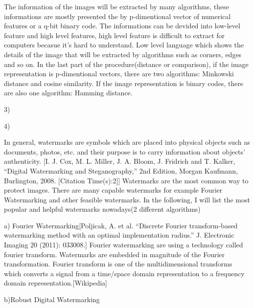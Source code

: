 The information of the images will be extracted by many algorithms, 
these informations are mostly presented the by p-dimentional vector of numerical features or a q-bit binary code.
The informations can be devided into low-level feature and high level features, 
high level feature is difficult to extract for computers becasue it's hard to understand.
Low level language which shows the details of the image that will be extracted by algorithms such as corners, edges and so on.
In the last part of the procedure(distance or comparison), if the image representation is p-dimentional vectors,
there are two algorithms: Minkowski distance and cosine similarity. If the image representation is binary codes, 
there are also one algorithm: Hamming distance.











3)









4)

In general, 
watermarks are symbols which are placed into physical objects such as documents, photos, etc. and their purpose is to carry information about objects’ authenticity.
[I. J. Cox, M. L. Miller, J. A. Bloom, J. Fridrich and T. Kalker, “Digital Watermarking and Steganography,” 2nd Edition, Morgan Kaufmann, Burlington, 2008.   [Citation Time(s):2]]
Watermarks are the most common way to protect images.
There are many capable watermarks for example Fourier Watermarking and other feasible watermarks.
In the following, I will list the most popular and helpful watermarks nowadays(2 different algorithms)

a) Fourier Watermarking[Poljicak, A. et al. “Discrete Fourier transform-based watermarking method with an optimal implementation radius.” J. Electronic Imaging 20 (2011): 033008.]
Fourier watermarking are using a technology called fourier transform.
Watermarks are embedded in magnitude of the Fourier transformation.
Fourier transform is one of the multidimensional transforms which converts a signal from a time/space domain representation to a frequency domain representation.[Wikipedia]


b)Robust Digital Watermarking




